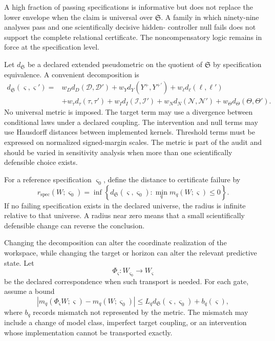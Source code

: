 A high fraction of passing specifications is informative but does not replace
the lower envelope when the claim is universal over \(\mathfrak S\). A family
in which ninety-nine analyses pass and one scientifically decisive hidden-
controller null fails does not support the complete relational certificate.
The noncompensatory logic remains in force at the specification level.


Let \(d_{\mathfrak S}\) be a declared extended pseudometric on the quotient of
\(\mathfrak S\) by specification equivalence. A convenient decomposition is
\[
\begin{aligned}
d_{\mathfrak S}(\varsigma,\varsigma')
={}&
 w_Dd_D(\mathcal D,\mathcal D')
+w_Yd_Y(Y^+,Y^{+'})
+w_\ell d_\ell(\ell,\ell')\\
&+w_\tau d_\tau(\tau,\tau')
+w_Id_I(\mathcal I,\mathcal I')
+w_Nd_N(\mathcal N,\mathcal N')
+w_\Theta d_\Theta(\Theta,\Theta').
\end{aligned}
\]
No universal metric is imposed. The target term may use a divergence between
conditional laws under a declared coupling. The intervention and null terms
may use Hausdorff distances between implemented kernels. Threshold terms must
be expressed on normalized signed-margin scales. The metric is part of the
audit and should be varied in sensitivity analysis when more than one
scientifically defensible choice exists.

For a reference specification \(\varsigma_0\), define the distance to
certificate failure by
\[
\boxed{
r_{\mathrm{spec}}(W;\varsigma_0)
=
\inf\left\{
 d_{\mathfrak S}(\varsigma,\varsigma_0):
 \min_q m_q(W;\varsigma)\leq0
\right\}.
}
\]
If no failing specification exists in the declared universe, the radius is
infinite relative to that universe. A radius near zero means that a small
scientifically defensible change can reverse the conclusion.


Changing the decomposition can alter the coordinate realization of the
workspace, while changing the target or horizon can alter the relevant
predictive state. Let
\[
\Phi_{\varsigma}:W_{\varsigma_0}\longrightarrow W_{\varsigma}
\]
be the declared correspondence when such transport is needed. For each gate,
assume a bound
\[
\left|
 m_q(\Phi_{\varsigma}W;\varsigma)
 -m_q(W;\varsigma_0)
\right|
\leq
L_qd_{\mathfrak S}(\varsigma,\varsigma_0)
+b_q(\varsigma),
\]
where \(b_q\) records mismatch not represented by the metric. The mismatch may
include a change of model class, imperfect target coupling, or an intervention
whose implementation cannot be transported exactly.

